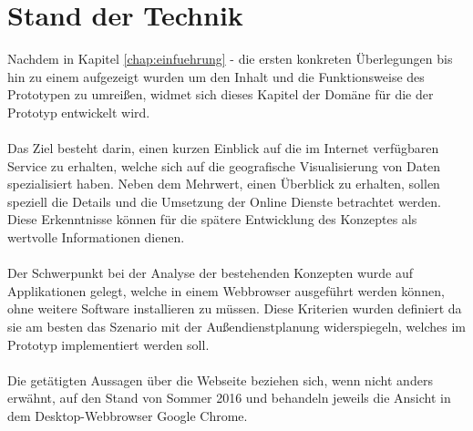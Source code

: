 \documentclass[../Bachelorarbeit.tex]{subfiles}
\begin{document}
\chapter{Stand der Technik}
\label{chap:analyse}

Nachdem in Kapitel \ref{chap:einfuehrung} -  die ersten konkreten Überlegungen bis hin zu einem  aufgezeigt wurden um den Inhalt und die Funktionsweise des Prototypen zu umreißen, widmet sich dieses Kapitel der Domäne für die der Prototyp entwickelt wird.\\
\\
Das Ziel besteht darin, einen kurzen Einblick auf die im Internet verfügbaren Service zu erhalten, welche sich auf die geografische Visualisierung von Daten spezialisiert haben. 
Neben dem Mehrwert, einen Überblick  zu erhalten, sollen speziell die Details und die Umsetzung der Online Dienste betrachtet werden.
Diese Erkenntnisse können für die spätere Entwicklung  des Konzeptes als wertvolle Informationen dienen.\\
\\
Der Schwerpunkt bei der Analyse der bestehenden Konzepten wurde auf Applikationen gelegt, welche in einem Webbrowser ausgeführt werden können, ohne weitere Software installieren zu müssen.
Diese Kriterien wurden definiert da sie am besten das Szenario mit der Außendienstplanung widerspiegeln, welches im Prototyp implementiert werden soll.\\
\\
Die getätigten Aussagen über die Webseite beziehen sich, wenn nicht anders erwähnt, auf den Stand von Sommer 2016 und behandeln jeweils die Ansicht in dem Desktop-Webbrowser Google Chrome.
\end{document}
